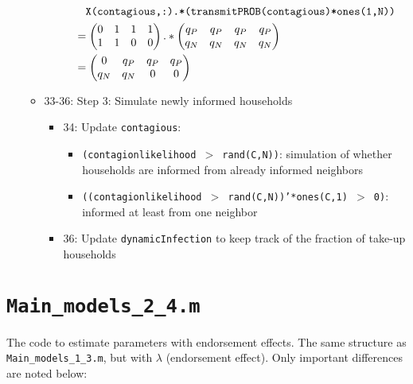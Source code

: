 \documentclass[10pt,letterpaper]{article}
\begin{document}
\begin{itemize}
\begin{itemize}
\begin{itemize}
            \begin{align*}
              &\quad \text{\texttt{X(contagious,:).*(transmitPROB(contagious)*ones(1,N))}} \\
              &= 
            \begin{pmatrix}
              0 & 1 & 1 & 1 \\
              1 & 1 & 0 & 0
            \end{pmatrix} .* 
            \begin{pmatrix}
              q_P & q_P & q_P & q_P \\
              q_N & q_N & q_N & q_N
            \end{pmatrix} \\
              &= \begin{pmatrix}
              0 & q_P & q_P & q_P \\
              q_N & q_N & 0 & 0
            \end{pmatrix}
            \end{align*}        
        \end{itemize}
      \item 33-36: Step 3: Simulate newly informed households
        \begin{itemize}
          \item 34: Update \texttt{contagious}:
            \begin{itemize}
              \item \texttt{(contagionlikelihood $>$ rand(C,N))}: simulation of whether households are informed from already informed neighbors
              \item \texttt{((contagionlikelihood $>$ rand(C,N))'*ones(C,1) $>$ 0)}: informed at least from one neighbor
            \end{itemize}
          \item 36: Update \texttt{dynamicInfection} to keep track of the fraction of take-up households
        \end{itemize}
    \end{itemize}
\end{itemize}

\section{\texttt{Main\_models\_2\_4.m}}\label{main_models_2_4}

The code to estimate parameters with endorsement effects.
The same structure as \texttt{Main\_models\_1\_3.m}, but with $\lambda$ (endorsement effect). 
Only important differences are noted below:
\end{document}

